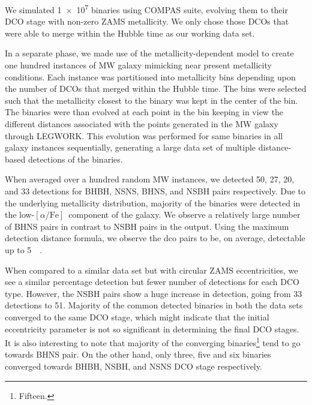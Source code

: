 \documentclass[journal, twocolumns]{IEEEtran}
\newcommand{\lowalpha}{low-$[\alpha/\text{Fe}]$}
\begin{document}
    We simulated \num{1e7} binaries using COMPAS suite, evolving them to their DCO stage with non-zero ZAMS metallicity.
    We only chose those DCOs that were able to merge within the Hubble time as our working data set.

    In a separate phase, we made use of the metallicity-dependent model to create one hundred instances of MW galaxy mimicking near present metallicity conditions.
    Each instance was partitioned into metallicity bins depending upon the number of DCOs that merged within the Hubble time.
    The bins were selected such that the metallicity closest to the binary was kept in the center of the bin.
    The binaries were than evolved at each point in the bin keeping in view the different distances associated with the points generated in the MW galaxy through LEGWORK\@.
    This evolution was performed for same binaries in all galaxy instances sequentially, generating a large data set of multiple distance-based detections of the binaries.

    When averaged over a hundred random MW instances, we detected 50, 27, 20, and 33 detections for BHBH, NSNS, BHNS, and NSBH pairs respectively.
    Due to the underlying metallicity distribution, majority of the binaries were detected in the \lowalpha\ component of the galaxy.
    We observe a relatively large number of BHNS pairs in contrast to NSBH pairs in the output.
    Using the maximum detection distance formula, we observe the dco pairs to be, on average, detectable up to \SI{5}{\mega\parsec}.

    When compared to a similar data set but with circular ZAMS eccentricities, we see a similar percentage detection but fewer number of detections for each DCO type.
    However, the NSBH pairs show a huge increase in detection, going from 33 detections to 51.
    Majority of the common detected binaries in both the data sets converged to the same DCO stage, which might indicate that the initial eccentricity parameter is not so significant in determining the final DCO stages.
    It is also interesting to note that majority of the converging binaries\footnote{Fifteen.} tend to go towards BHNS pair.
    On the other hand, only three, five and six binaries converged towards BHBH, NSBH, and NSNS DCO stage respectively.

    \cleardoublepage
    
    
    \cleardoublepage
    \appendices
    
    \newpage
    
    \newpage
    
    \newpage
    
\end{document}
